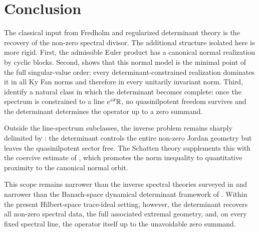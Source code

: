 \section{Conclusion}\label{sec:conclusion}

The classical input from Fredholm and regularized determinant theory is
the recovery of the non-zero spectral divisor. The additional structure
isolated here is more rigid. First, the admissible Euler product has a
canonical normal realization by cyclic blocks. Second,
 shows that this normal model is the minimal
point of the full singular-value order: every determinant-constrained
realization dominates it in all Ky Fan norms and therefore in every
unitarily invariant norm. Third,
 identify a
natural class in which the determinant becomes complete: once the
spectrum is constrained to a line \(e^{i\vartheta}\mathbb{R}\), no
quasinilpotent freedom survives and the determinant determines the
operator up to a zero summand.

Outside the line-spectrum subclasses, the inverse problem remains
sharply delimited by : the determinant
controls the entire non-zero Jordan geometry but leaves the
quasinilpotent sector free. The Schatten theory supplements this with
the coercive estimate of ,
which promotes the norm inequality to quantitative proximity to the
canonical normal orbit.

This scope remains narrower than the inverse spectral theories surveyed
in \cite{PoschelTrubowitz1987,Marchenko2011} and narrower than the
Banach-space dynamical determinant framework of
\cite{Ruelle1990Extension,Pollicott1986Meromorphic,Baladi2018DynZeta}.
Within the present Hilbert-space trace-ideal setting, however, the
determinant recovers all non-zero spectral data, the full associated
extremal geometry, and, on every fixed spectral line, the operator
itself up to the unavoidable zero summand.
